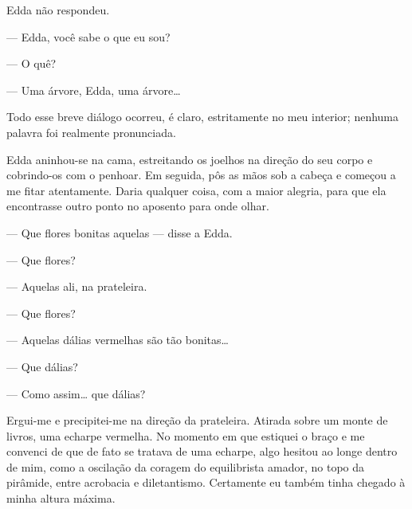 Edda não respondeu.

--- Edda, você sabe o que eu sou?

--- O quê?

--- Uma árvore, Edda, uma árvore\ldots{}

Todo esse breve diálogo ocorreu, é claro, estritamente no meu interior;
nenhuma palavra foi realmente pronunciada.

Edda aninhou-se na cama, estreitando os joelhos na direção do seu corpo e
cobrindo-os com o penhoar. Em seguida, pôs as mãos sob a cabeça e começou a
me fitar atentamente. Daria qualquer coisa, com a maior alegria, para que ela
encontrasse outro ponto no aposento para onde olhar.


--- Que flores bonitas aquelas --- disse a Edda.

--- Que flores?

--- Aquelas ali, na prateleira.

--- Que flores?

--- Aquelas dálias vermelhas são tão bonitas\ldots{}

--- Que dálias?

--- Como assim\ldots{} que dálias?

Ergui-me e precipitei-me na direção da prateleira. Atirada sobre um monte de
livros, uma echarpe vermelha. No momento em que estiquei o braço e me
convenci de que de fato se tratava de uma echarpe, algo hesitou ao longe
dentro de mim, como a oscilação da coragem do equilibrista amador, no topo da
pirâmide, entre acrobacia e diletantismo. Certamente eu também tinha chegado
à minha altura máxima.

